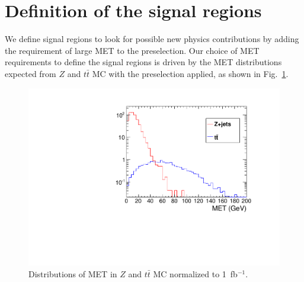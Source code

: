 \section{Definition of the signal regions}
\label{sec:sigregion}

We define signal regions to look for possible
new physics contributions by adding the requirement of large MET to the preselection. 
Our choice of MET requirements to define the signal regions is driven by the 
MET distributions expected from $Z$ and $t\bar{t}$ MC with the preselection applied, 
as shown in Fig.~\ref{fig:metdist}.

\begin{figure}[tbh]
\begin{center}
\includegraphics[width=0.75\linewidth]{plots/met_ttbar_Z.pdf}
\caption{\label{fig:metdist}\protect Distributions of MET in $Z$ and $t\bar{t}$ MC normalized to 1~fb$^{-1}$.}
\end{center}
\end{figure}

